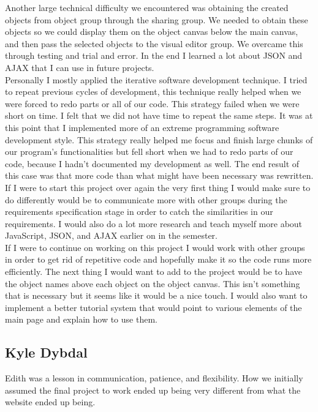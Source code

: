 \documentclass[12pt]{article}
\begin{document}
Another large technical difficulty we encountered was obtaining the created objects from object group through the sharing group. We needed to obtain these objects so we could display them on the object canvas below the main canvas, and then pass the selected objects to the visual editor group. We overcame this through testing and trial and error. In the end I learned a lot about JSON and AJAX that I can use in future projects. \\

Personally I mostly applied the iterative software development technique. I tried to repeat previous cycles of development, this technique really helped when we were forced to redo parts or all of our code. This strategy failed when we were short on time. I felt that we did not have time to repeat the same steps. It was at this point that I implemented more of an extreme programming software development style. This strategy really helped me focus and finish large chunks of our program's functionalities but fell short when we had to redo parts of our code, because I hadn't documented my development as well. The end result of this case was that more code than what might have been necessary was rewritten. \\

If I were to start this project over again the very first thing I would make sure to do differently would be to communicate more with other groups during the requirements specification stage in order to catch the similarities in our requirements. I would also do a lot more research and teach myself more about JavaScript, JSON, and AJAX earlier on in the semester. \\

If I were to continue on working on this project I would work with other groups in order to get rid of repetitive code and hopefully make it so the code runs more efficiently. The next thing I would want to add to the project would be to have the object names above each object on the object canvas. This isn't something that is necessary but it seems like it would be a nice touch. I would also want to implement a better tutorial system that would point to various elements of the main page and explain how to use them.

\subsection{Kyle Dybdal}

Edith was a lesson in communication, patience, and flexibility. How we initially assumed the final project to work ended up being very different from what the website ended up being. \\
\end{document}

